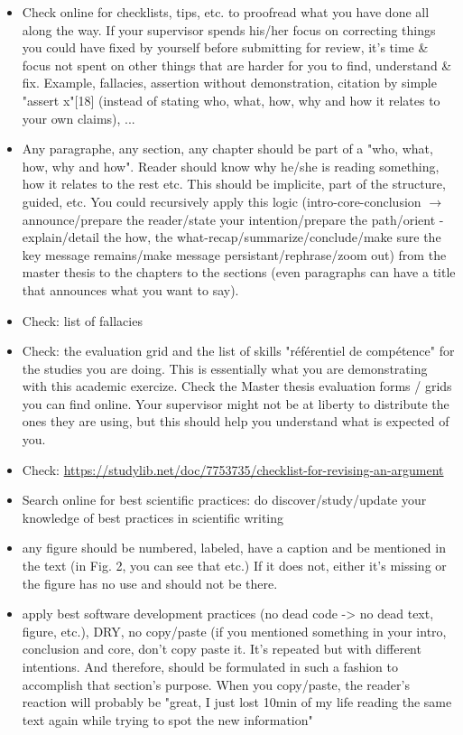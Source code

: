 \begin{itemize}
    \item Check online for checklists, tips, etc. to proofread what you have done all along the way. If your supervisor spends his/her focus on correcting things you could have fixed by yourself before submitting for review, it's time & focus not spent on other things that are harder for you to find, understand & fix. Example, fallacies, assertion without demonstration, citation by simple "assert x"[18] (instead of stating who, what, how, why and how it relates to your own claims), ...
    \item Any paragraphe, any section, any chapter should be part of a "who, what, how, why and how". Reader should know why he/she is reading something, how it relates to the rest etc. This should be implicite, part of the structure, guided, etc. You could recursively apply this logic (intro-core-conclusion $\longrightarrow$ announce/prepare the reader/state your intention/prepare the path/orient - explain/detail the how, the what-recap/summarize/conclude/make sure the key message remains/make message persistant/rephrase/zoom out) from the master thesis to the chapters to the sections (even paragraphs can have a title that announces what you want to say).
    \item Check: list of fallacies
    \item Check: the evaluation grid and the list of skills "référentiel de compétence" for the studies you are doing. This is essentially what you are demonstrating with this academic exercize. Check the Master thesis evaluation forms / grids you can find online. Your supervisor might not be at liberty to distribute the ones they are using, but this should help you understand what is expected of you.
    \item Check: \url{https://studylib.net/doc/7753735/checklist-for-revising-an-argument}
    \item Search online for best scientific practices: do discover/study/update your knowledge of best practices in scientific writing
    \item any figure should be numbered, labeled, have a caption and be mentioned in the text (in Fig. 2, you can see that etc.) If it does not, either it's missing or the figure has no use and should not be there.
    \item apply best software development practices (no dead code -> no dead text, figure, etc.), DRY, no copy/paste (if you mentioned something in your intro, conclusion and core, don't copy paste it. It's repeated but with different intentions. And therefore, should be formulated in such a fashion to accomplish that section's purpose. When you copy/paste, the reader's reaction will probably be "great, I just lost 10min of my life reading the same text again while trying to spot the new information"

\end{itemize}
